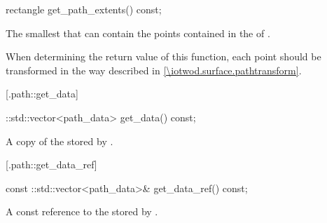%
%
\begin{itemdecl}
rectangle get_path_extents() const;
\end{itemdecl}
\begin{itemdescr}
	\pnum
	\returns
	The smallest  that can contain the points contained in the 
	 of .
	
	\pnum
	\remarks
	When determining the return value of this function, each point should be 
	transformed in the way described in \ref{\iotwod.surface.pathtransform}.
\end{itemdescr}

 [\iotwod.path::get_data] {}

%
%
\begin{itemdecl}
::std::vector<path_data> get_data() const;
\end{itemdecl}
\begin{itemdescr}
	\pnum
	\returns
	A copy of the  stored by .
\end{itemdescr}

 [\iotwod.path::get_data_ref] {}

%
%
\begin{itemdecl}
const ::std::vector<path_data>& get_data_ref() const;
\end{itemdecl}
\begin{itemdescr}
	\pnum
	\returns
	A const reference to the  stored by .
\end{itemdescr}
